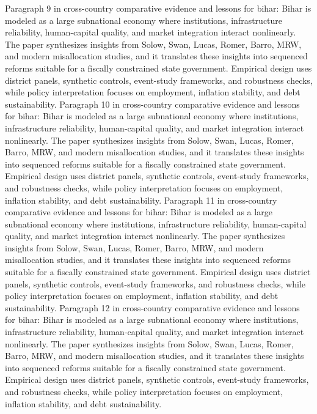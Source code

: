 \documentclass[preprint,12pt]{elsarticle}
\begin{document}
Paragraph 9 in cross-country comparative evidence and lessons for bihar: Bihar is modeled as a large subnational economy where institutions, infrastructure reliability, human-capital quality, and market integration interact nonlinearly. The paper synthesizes insights from Solow, Swan, Lucas, Romer, Barro, MRW, and modern misallocation studies, and it translates these insights into sequenced reforms suitable for a fiscally constrained state government. Empirical design uses district panels, synthetic controls, event-study frameworks, and robustness checks, while policy interpretation focuses on employment, inflation stability, and debt sustainability.
Paragraph 10 in cross-country comparative evidence and lessons for bihar: Bihar is modeled as a large subnational economy where institutions, infrastructure reliability, human-capital quality, and market integration interact nonlinearly. The paper synthesizes insights from Solow, Swan, Lucas, Romer, Barro, MRW, and modern misallocation studies, and it translates these insights into sequenced reforms suitable for a fiscally constrained state government. Empirical design uses district panels, synthetic controls, event-study frameworks, and robustness checks, while policy interpretation focuses on employment, inflation stability, and debt sustainability.
Paragraph 11 in cross-country comparative evidence and lessons for bihar: Bihar is modeled as a large subnational economy where institutions, infrastructure reliability, human-capital quality, and market integration interact nonlinearly. The paper synthesizes insights from Solow, Swan, Lucas, Romer, Barro, MRW, and modern misallocation studies, and it translates these insights into sequenced reforms suitable for a fiscally constrained state government. Empirical design uses district panels, synthetic controls, event-study frameworks, and robustness checks, while policy interpretation focuses on employment, inflation stability, and debt sustainability.
Paragraph 12 in cross-country comparative evidence and lessons for bihar: Bihar is modeled as a large subnational economy where institutions, infrastructure reliability, human-capital quality, and market integration interact nonlinearly. The paper synthesizes insights from Solow, Swan, Lucas, Romer, Barro, MRW, and modern misallocation studies, and it translates these insights into sequenced reforms suitable for a fiscally constrained state government. Empirical design uses district panels, synthetic controls, event-study frameworks, and robustness checks, while policy interpretation focuses on employment, inflation stability, and debt sustainability.
\end{document}
